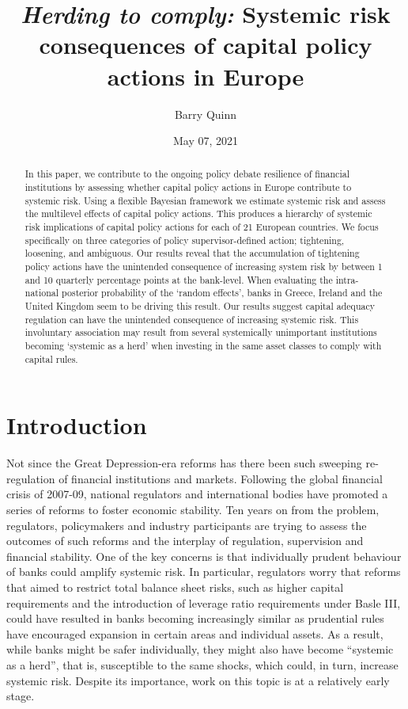 \documentclass[
  10pt,
]{article}
\title{\emph{Herding to comply:} Systemic risk consequences of capital policy
actions in Europe}
\author{Barry Quinn}
\date{May 07, 2021}
\begin{document}
\maketitle
\begin{abstract}
In this paper, we contribute to the ongoing policy debate resilience of
financial institutions by assessing whether capital policy actions in
Europe contribute to systemic risk. Using a flexible Bayesian framework
we estimate systemic risk and assess the multilevel effects of capital
policy actions. This produces a hierarchy of systemic risk implications
of capital policy actions for each of 21 European countries. We focus
specifically on three categories of policy supervisor-defined action;
tightening, loosening, and ambiguous. Our results reveal that the
accumulation of tightening policy actions have the unintended
consequence of increasing system risk by between 1 and 10 quarterly
percentage points at the bank-level. When evaluating the intra-national
posterior probability of the `random effects', banks in Greece, Ireland
and the United Kingdom seem to be driving this result. Our results
suggest capital adequacy regulation can have the unintended consequence
of increasing systemic risk. This involuntary association may result
from several systemically unimportant institutions becoming `systemic as
a herd' when investing in the same asset classes to comply with capital
rules.
\end{abstract}

\hypertarget{introduction}{%
\section{Introduction}\label{introduction}}

Not since the Great Depression-era reforms has there been such sweeping
re-regulation of financial institutions and markets. Following the
global financial crisis of 2007-09, national regulators and
international bodies have promoted a series of reforms to foster
economic stability. Ten years on from the problem, regulators,
policymakers and industry participants are trying to assess the outcomes
of such reforms and the interplay of regulation, supervision and
financial stability. One of the key concerns is that individually
prudent behaviour of banks could amplify systemic risk. In particular,
regulators worry that reforms that aimed to restrict total balance sheet
risks, such as higher capital requirements and the introduction of
leverage ratio requirements under Basle III, could have resulted in
banks becoming increasingly similar as prudential rules have encouraged
expansion in certain areas and individual assets. As a result, while
banks might be safer individually, they might also have become
``systemic as a herd'', that is, susceptible to the same shocks, which
could, in turn, increase systemic risk. Despite its importance, work on
this topic is at a relatively early stage.
\end{document}
